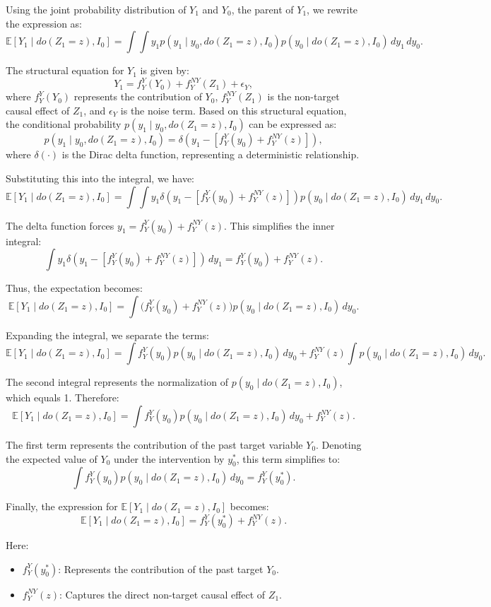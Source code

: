 \documentclass[a4paper,10pt]{article}
\begin{document}
Using the joint probability distribution of \(Y_1\) and \(Y_0\), the parent of \(Y_1\), we rewrite the expression as:
\[
\mathbb{E}[Y_1 \mid do(Z_1 = z), I_0] = \int \int y_1 p(y_1 \mid y_0, do(Z_1 = z), I_0) p(y_0 \mid do(Z_1 = z), I_0) \, dy_1 \, dy_0.
\]

The structural equation for \(Y_1\) is given by:
\[
Y_1 = f_Y^Y(Y_0) + f_Y^{NY}(Z_1) + \epsilon_Y,
\]
where \(f_Y^Y(Y_0)\) represents the contribution of \(Y_0\), \(f_Y^{NY}(Z_1)\) is the non-target causal effect of \(Z_1\), and \(\epsilon_Y\) is the noise term. Based on this structural equation, the conditional probability \(p(y_1 \mid y_0, do(Z_1 = z), I_0)\) can be expressed as:
\[
p(y_1 \mid y_0, do(Z_1 = z), I_0) = \delta(y_1 - [f_Y^Y(y_0) + f_Y^{NY}(z)]),
\]
where \(\delta(\cdot)\) is the Dirac delta function, representing a deterministic relationship.

Substituting this into the integral, we have:
\[
\mathbb{E}[Y_1 \mid do(Z_1 = z), I_0] = \int \int y_1 \delta(y_1 - [f_Y^Y(y_0) + f_Y^{NY}(z)]) p(y_0 \mid do(Z_1 = z), I_0) \, dy_1 \, dy_0.
\]

The delta function forces \(y_1 = f_Y^Y(y_0) + f_Y^{NY}(z)\). This simplifies the inner integral:
\[
\int y_1 \delta(y_1 - [f_Y^Y(y_0) + f_Y^{NY}(z)]) \, dy_1 = f_Y^Y(y_0) + f_Y^{NY}(z).
\]

Thus, the expectation becomes:
\[
\mathbb{E}[Y_1 \mid do(Z_1 = z), I_0] = \int \big(f_Y^Y(y_0) + f_Y^{NY}(z)\big) p(y_0 \mid do(Z_1 = z), I_0) \, dy_0.
\]

Expanding the integral, we separate the terms:
\[
\mathbb{E}[Y_1 \mid do(Z_1 = z), I_0] = \int f_Y^Y(y_0) p(y_0 \mid do(Z_1 = z), I_0) \, dy_0 + f_Y^{NY}(z) \int p(y_0 \mid do(Z_1 = z), I_0) \, dy_0.
\]

The second integral represents the normalization of \(p(y_0 \mid do(Z_1 = z), I_0)\), which equals 1. Therefore:
\[
\mathbb{E}[Y_1 \mid do(Z_1 = z), I_0] = \int f_Y^Y(y_0) p(y_0 \mid do(Z_1 = z), I_0) \, dy_0 + f_Y^{NY}(z).
\]

The first term represents the contribution of the past target variable \(Y_0\). Denoting the expected value of \(Y_0\) under the intervention by \(y_0^\ast\), this term simplifies to:
\[
\int f_Y^Y(y_0) p(y_0 \mid do(Z_1 = z), I_0) \, dy_0 = f_Y^Y(y_0^\ast).
\]

Finally, the expression for \(\mathbb{E}[Y_1 \mid do(Z_1 = z), I_0]\) becomes:
\[
\mathbb{E}[Y_1 \mid do(Z_1 = z), I_0] = f_Y^Y(y_0^\ast) + f_Y^{NY}(z).
\]

Here:
\begin{itemize}
    \item \(f_Y^Y(y_0^\ast)\): Represents the contribution of the past target \(Y_0\).
    \item \(f_Y^{NY}(z)\): Captures the direct non-target causal effect of \(Z_1\).
\end{itemize}
\end{document}
